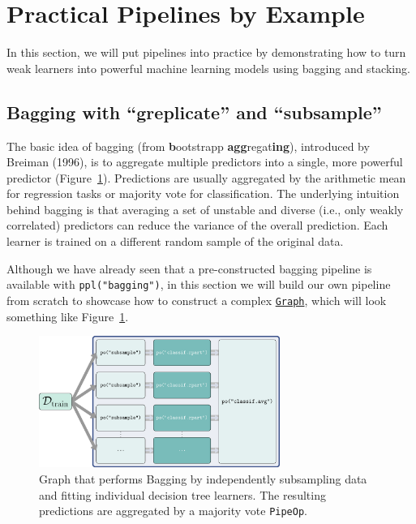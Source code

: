 \hypertarget{practical-pipelines-by-example}{%
\section{Practical Pipelines by
Example}\label{practical-pipelines-by-example}}

In this section, we will put pipelines into practice by demonstrating
how to turn weak learners into powerful machine learning models using
bagging and stacking.

\hypertarget{sec-pipelines-bagging}{%
\subsection{Bagging with ``greplicate'' and
``subsample''}\label{sec-pipelines-bagging}}

The basic idea of bagging (from \textbf{b}ootstrapp
\textbf{agg}regat\textbf{ing}), introduced by Breiman (1996), is to
aggregate multiple predictors into a single, more powerful predictor
(Figure~\ref{fig-pipelines-bagging}). Predictions are usually aggregated
by the arithmetic mean for regression tasks or majority vote for
classification. The underlying intuition behind bagging is that
averaging a set of unstable and diverse (i.e., only weakly correlated)
predictors can reduce the variance of the overall prediction. Each
learner is trained on a different random sample of the original data.

Although we have already seen that a pre-constructed bagging pipeline is
available with \texttt{ppl("bagging")}, in this section we will build
our own pipeline from scratch to showcase how to construct a complex
\href{https://mlr3pipelines.mlr-org.com/reference/Graph.html}{\texttt{Graph}},
which will look something like Figure~\ref{fig-pipelines-bagging}.

\begin{figure}

{\centering \includegraphics[width=0.7\textwidth,height=\textheight]{chapters/chapter8/Figures/mlr3book_figures-26.png}

}

\caption{\label{fig-pipelines-bagging}Graph that performs Bagging by
independently subsampling data and fitting individual decision tree
learners. The resulting predictions are aggregated by a majority vote
\texttt{PipeOp}.}

\end{figure}

